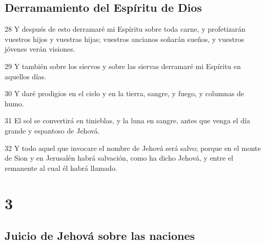 \section*{Derramamiento del Espíritu de Dios}

\par 28 Y después de esto derramaré mi Espíritu sobre toda carne, y profetizarán vuestros hijos y vuestras hijas; vuestros ancianos soñarán sueños, y vuestros jóvenes verán visiones.
\par 29 Y también sobre los siervos y sobre las siervas derramaré mi Espíritu en aquellos días.
\par 30 Y daré prodigios en el cielo y en la tierra, sangre, y fuego, y columnas de humo.
\par 31 El sol se convertirá en tinieblas, y la luna en sangre, antes que venga el día grande y espantoso de Jehová.
\par 32 Y todo aquel que invocare el nombre de Jehová será salvo; porque en el monte de Sion y en Jerusalén habrá salvación, como ha dicho Jehová, y entre el remanente al cual él habrá llamado. 

\chapter{3}

\section*{Juicio de Jehová sobre las naciones}

